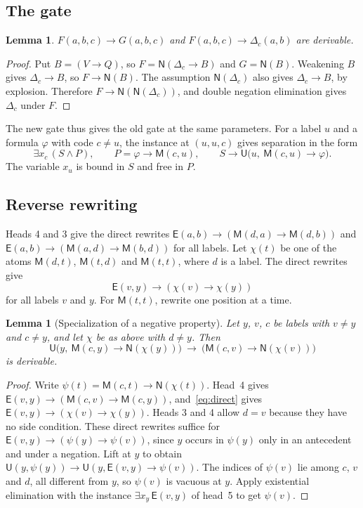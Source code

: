 \documentclass[11pt,letterpaper]{article}
\newtheorem{lemma}[theorem]{Lemma}
\newcommand{\Mc}{\mathsf{M}}
\newcommand{\Uc}{\mathsf{U}}
\newcommand{\Ec}{\mathsf{E}}
\newcommand{\Nc}{\mathsf{N}}
\begin{document}
\subsection{The gate}

\begin{lemma}\label{lem:extract}
$F(a,b,c)\to G(a,b,c)$ and $F(a,b,c)\to\Delta_c(a,b)$ are derivable.
\end{lemma}

\begin{proof}
Put $B=(V\to Q)$, so $F=\Nc(\Delta_c\to B)$ and $G=\Nc(B)$.
Weakening $B$ gives $\Delta_c\to B$, so $F\to\Nc(B)$. The assumption
$\Nc(\Delta_c)$ also gives $\Delta_c\to B$, by explosion. Therefore
$F\to\Nc(\Nc(\Delta_c))$, and double negation elimination gives
$\Delta_c$ under $F$.
\end{proof}

The new gate thus gives the old gate at the same parameters. For a
label $u$ and a formula $\varphi$ with code $c\ne u$, the instance
at $(u,u,c)$ gives separation in the form
\begin{equation}\label{eq:sep}
 \exists x_c\,(S\wedge P),\qquad
 P=\varphi\to\Mc(c,u),\qquad
 S\to\Uc\bigl(u,\ \Mc(c,u)\to\varphi\bigr).
\end{equation}
The variable $x_u$ is bound in $S$ and free in $P$.

\subsection{Reverse rewriting}

Heads 4 and 3 give the direct rewrites
$\Ec(a,b)\to(\Mc(d,a)\to\Mc(d,b))$ and
$\Ec(a,b)\to(\Mc(a,d)\to\Mc(b,d))$ for all labels. Let $\chi(t)$ be
one of the atoms $\Mc(d,t)$, $\Mc(t,d)$ and $\Mc(t,t)$, where $d$ is a
label. The direct rewrites give
\begin{equation}\label{eq:direct}
 \Ec(v,y)\to(\chi(v)\to\chi(y))
\end{equation}
for all labels $v$ and $y$. For $\Mc(t,t)$, rewrite one position
at a time.

\begin{lemma}[Specialization of a negative property]\label{lem:spec}
Let $y$, $v$, $c$ be labels with $v\ne y$ and $c\ne y$, and let
$\chi$ be as above with $d\ne y$. Then
\[
 \Uc\bigl(y,\ \Mc(c,y)\to\Nc(\chi(y))\bigr)\ \to\
 \bigl(\Mc(c,v)\to\Nc(\chi(v))\bigr)
\]
is derivable.
\end{lemma}

\begin{proof}
Write $\psi(t)=\Mc(c,t)\to\Nc(\chi(t))$. Head~4 gives
$\Ec(v,y)\to(\Mc(c,v)\to\Mc(c,y))$, and~\eqref{eq:direct} gives
$\Ec(v,y)\to(\chi(v)\to\chi(y))$. Heads 3 and 4 allow $d=v$
because they have no side condition. These direct rewrites suffice
for $\Ec(v,y)\to(\psi(y)\to\psi(v))$, since $y$ occurs in $\psi(y)$
only in an antecedent and under a negation. Lift at $y$ to obtain
$\Uc(y,\psi(y))\to\Uc(y,\Ec(v,y)\to\psi(v))$. The indices of
$\psi(v)$ lie among $c$, $v$ and $d$, all different from $y$, so
$\psi(v)$ is vacuous at $y$. Apply existential elimination with the
instance $\exists x_y\,\Ec(v,y)$ of head~5 to get $\psi(v)$.
\end{proof}
\end{document}
